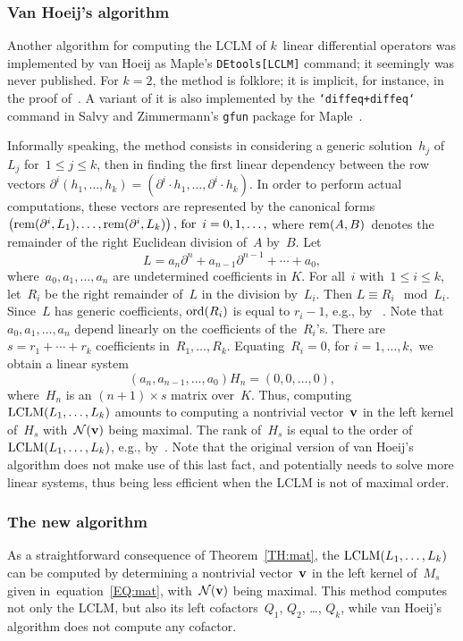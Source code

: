 \documentclass{sig-alt-full}
\newcommand{\cN}{ {\cal N}}
\newcommand{\pa} { \partial}
\newcommand{\rem }{ {\rm rem}}
\newcommand{\vv}{ {\bf v}}
\newcommand{\ord} { {\rm ord}}
\newcommand{\lclm} { {\rm LCLM}}
\begin{document}
\subsubsection{Van Hoeij's algorithm}
Another algorithm for computing the LCLM of $k$~linear differential operators was implemented by van Hoeij as Maple's \verb+DEtools[LCLM]+ command; it seemingly was never published.
For $k=2$, the method is folklore; it is implicit, for instance, in the proof of~\cite[Theorem~2.3]{Stanley80}. A variant of it is also implemented  by the \texttt{`diffeq+diffeq`} command in Salvy and Zimmermann's \verb+gfun+ package for Maple~\cite{SaZi94}.

Informally speaking, the method consists in considering a generic solution~$h_j$ of~$L_j$ for~$1\leq j\leq k$, then in finding the first linear dependency between the row vectors $\partial^i(h_1,\dots,h_k)=(\partial^i\cdot h_1,\dots,\partial^i\cdot h_k)$.
In order to perform actual computations, these vectors are represented by the canonical forms
$ \left( \rem(\partial^i,L_1),\dots,\rem(\partial^i,L_k) \right), \, \textrm{for } \, i=0,1,\ldots,$
where $\rem(A,B)$~denotes the remainder of the right Euclidean division of~$A$ by~$B$.
Let \[ L = a_n \pa^{n} + a_{n-1} \pa^{n-1} + \cdots + a_0, \]
where~$a_0, a_1, \ldots, a_n$ are undetermined coefficients in $K$.
For all~$i$ with~$1 \le i \le k$, let~$R_i$ be the right remainder
of~$L$ in the division by~$L_i$. Then $L \equiv R_i \mod L_i.$
Since~$L$ has generic coefficients,  $\ord(R_i)$ is equal to $r_i-1$, e.g., by ~\cite[Lemma~2.3]{Li98}.
Note that~$a_0, a_1, \ldots, a_n$ depend linearly on the coefficients of the~$R_i$'s.
There are $s=r_1+ \cdots + r_k$ coefficients in~$R_1,\ldots, R_k$.
Equating~$R_i=0$, for $i=1, \ldots, k,$  we obtain a linear system
\[ (a_n, a_{n-1}, \ldots, a_0) H_n = (0, 0, \ldots, 0), \]
where~$H_n$ is an $(n+1) \times s$ matrix over~$K$. Thus, computing~$\lclm(L_1, \ldots, L_k)$
amounts to computing a nontrivial vector~$\vv$ in the left kernel of~$H_s$ with~$\cN(\vv)$ being maximal.
The rank of~$H_s$ is equal to the order of~$\lclm(L_1, \ldots, L_k)$,
e.g., by~\cite[Proposition~4.3]{AbLeLi05}. Note that the original version of van Hoeij's algorithm does not make use of this last fact, and potentially needs to solve more linear systems, thus being less efficient when the LCLM is not of maximal order. 

\subsubsection{The new algorithm}
As a straightforward consequence of Theorem~\ref{TH:mat}, the $\lclm(L_1, \ldots, L_k)$ can be computed
by determining a nontrivial vector~$\vv$ in the left kernel of~$M_s$ given in~equation~\eqref{EQ:mat},
with~$\cN(\vv)$ being maximal. This method computes not only the LCLM, but also its left cofactors~$Q_1$,
$Q_2$, \ldots, $Q_k$, while van Hoeij's algorithm does not
compute any cofactor.
\end{document}
